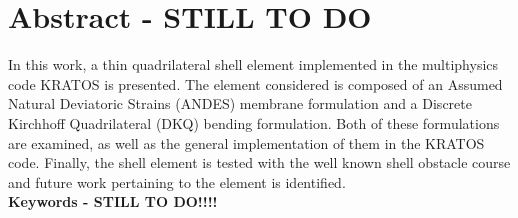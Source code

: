 
\chapter*{Abstract - STILL TO DO}
\label{cha:abstract}

In this work, a thin quadrilateral shell element implemented in the multiphysics code KRATOS is presented. The element considered is composed of an Assumed Natural Deviatoric Strains (ANDES) membrane formulation and a Discrete Kirchhoff Quadrilateral (DKQ) bending formulation. Both of these formulations are examined, as well as the general implementation of them in the KRATOS code. Finally, the shell element is tested with the well known shell obstacle course and future work pertaining to the element is identified.\\


{\textcolor{gray75}{\Huge\bfseries{Keywords - STILL TO DO!!!!}}}

\keywords